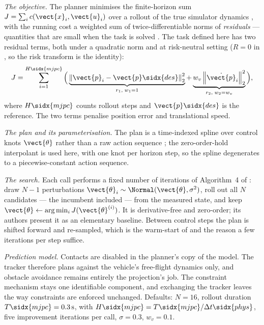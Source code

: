 \emph{The objective.} The planner minimises the finite-horizon sum
$J = \sum_{i} c(\vect{x}_{i},\vect{u}_{i})$ over a rollout of the true simulator dynamics
\parencite[Eq.~(3)]{howell2022predictive}, with the running cost a weighted sum of twice-differentiable
norms of \emph{residuals} --- quantities that are small when the task is solved
\parencite[Eq.~(4)]{howell2022predictive}. The task defined here has two residual terms, both under a
quadratic norm and at risk-neutral setting ($R = 0$ in
\parencite[Eq.~(5)]{howell2022predictive}, so the risk transform is the identity):
\begin{equation}\label{eq:method:dep:mjpc}
  J = \sum_{i=1}^{H\sidx{mjpc}}
      \Big(\underbrace{\left\|\vect{p}_{i}-\vect{p}\sidx{des}\right\|_{2}^{2}}_{r_{1},\;w_{1}=1}
      + \underbrace{w_{v}\left\|\dot{\vect{p}}_{i}\right\|_{2}^{2}}_{r_{2},\;w_{2}=w_{v}}\Big),
\end{equation}
where $H\sidx{mjpc}$ counts rollout steps and $\vect{p}\sidx{des}$ is the reference.
The two terms penalise position error and translational speed.

\emph{The plan and its parameterisation.} The plan is a time-indexed spline over control knots
$\vect{\theta}$ rather than a raw action sequence \parencite[\S3.3]{howell2022predictive}; the
zero-order-hold interpolant is used here, with one knot per horizon step, so the spline degenerates
to a piecewise-constant action sequence.

\emph{The search.} Each call performs a fixed number of iterations of Algorithm~4 of
\parencite{howell2022predictive}: draw $N-1$ perturbations
$\vect{\theta}_{i} \sim \Normal(\vect{\theta},\sigma^{2})$, roll out all $N$ candidates --- the
incumbent included --- from the measured state, and keep
$\vect{\theta} \leftarrow \arg\min_{i} J(\vect{\theta}^{(i)})$. It is derivative-free and zero-order;
its authors present it as an elementary baseline. Between control steps the plan is shifted forward
and re-sampled, which is the warm-start of
\parencite[Alg.~1]{howell2022predictive} and the reason a few iterations per step suffice.

\emph{Prediction model.} Contacts are disabled in the planner's copy of the model. The
tracker therefore plans against the vehicle's free-flight dynamics only, and obstacle avoidance
remains entirely the projection's job. The constraint mechanism stays one identifiable component,
and exchanging the tracker leaves the way constraints are enforced unchanged.
Defaults: $N = 16$, rollout duration $T\sidx{mjpc} = 0.3\,\textrm{s}$, with
$H\sidx{mjpc}=T\sidx{mjpc}/\Delta t\sidx{phys}$, five improvement iterations
per call, $\sigma = 0.3$, $w_{v} = 0.1$.


